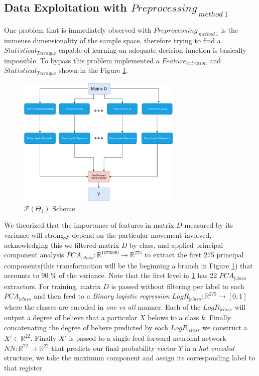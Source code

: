 \subsection{Data Exploitation with $Preprocessing_{ \ method \ 1}$}

One problem that is immediately observed with $Preprocessing_{ \ method \ 1}$ is the immense dimensionality of the sample space, therefore trying to find a $Statistical_{Tecnique}$  capable of learning an adequate decision function is basically impossible. To bypass this problem implemented a $Feature_{extration}$ and $Statistical_{Tecnique}$ shown in the Figure \ref{dig:p1}.


\begin{figure}[htpb!]
	\centering 
	\includegraphics[width=0.7\textwidth]{images/scheme_1.pdf}
	\caption{$\mathcal{P}(\Theta_{1})$  Scheme} 
	\label{dig:p1} 
\end{figure}

We theorized that the importance of features in matrix $D$ measured by its variance will strongly depend on the particular movement involved, acknowledging this we filtered matrix $D$ by class, and applied principal component analysis $PCA_{|class}: \mathbb{R}^{1079390} \longrightarrow \mathbb{R}^{275}$ to extract the first 275 principal components(this transformation will be the beginning a branch in Figure \ref{dig:p1}) that accounts to 90 $\%$ of the variance. Note that the first level in \ref{dig:p1} has 22 $PCA_{|class}$ extractors. For training, matrix $D$ is passed without filtering per label to each $PCA_{|class}$ and then feed to a \textit{Binary logistic regression} $LogR_{|class}: \mathbb{R}^{275} \longrightarrow [0,1]$ where the classes are encoded in \textit{one vs all} manner. Each of the $LogR_{|class}$ will output a degree of believe that a particular $X$ belows to a class $k$. Finally concatenating the degree of believe predicted by each $LogR_{|class}$ we construct a $X' \in \mathbb{R}^{22}$. Finally $X'$ is passed to a single feed forward neuronal network $NN: \mathbb{R}^{22} \longrightarrow  \mathbb{R}^{22} $ that predicts our final probability vector $Y$ in a \textit{hot encoded} structure, we take the maximum component and assign its corresponding label to that register.


